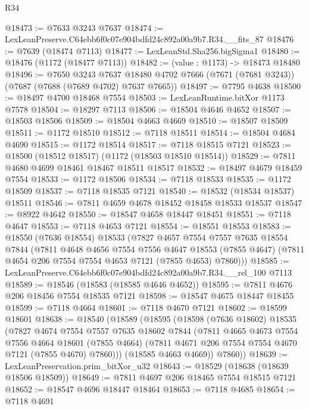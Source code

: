\begin{lexlean}{R34}
\begin{coremodule}
@18473 := @7633 @3243 @7637
@18474 := LexLeanPreserve.C64ebb6f0c07e904bdfd24c892a00a9b7.R34.__fits_87
@18476 := @7639 (@18474 @7113)
@18477 := LexLeanStd.Sha256.bigSigma1
@18480 := @18476 (@1172 (@18477 @7113))
@18482 := (value : @1173) -> @18473 @18480
@18496 := @7650
    @3243
    @7637
    @18480
    @4702
    @7666
    (@7671 (@7681 @3243))
    (@7687 (@7688 (@7689 @4702) @7637 @7665))
@18497 := @7795 @4638
@18500 := @18497 @4700 @18468 @7554
@18503 := LexLeanRuntime.bitXor @1173 @7578
@18504 := @18297 @7113
@18506 := @18504 @4646 @4652
@18507 := @18503 @18506
@18509 := @18504 @4663 @4669
@18510 := @18507 @18509
@18511 := @1172 @18510
@18512 := @7118 @18511
@18514 := @18504 @4684 @4690
@18515 := @1172 @18514
@18517 := @7118 @18515 @7121
@18523 := @18500 (@18512 @18517) (@1172 (@18503 @18510 @18514))
@18529 := @7811 @4680 @4699 @18461 @18467 @18511 @18517
@18532 := @18497 @4679 @18459 @7554
@18533 := @1172 @18506
@18534 := @7118 @18533
@18535 := @1172 @18509
@18537 := @7118 @18535 @7121
@18540 := @18532 (@18534 @18537) @18511
@18546 := @7811 @4659 @4678 @18452 @18458 @18533 @18537
@18547 := @8922 @4642
@18550 := @18547 @4658 @18447 @18451
@18551 := @7118 @4647
@18553 := @7118 @4653 @7121
@18554 := @18551 @18553
@18583 := @18550
    (@7636 @18554)
    @18533
    (@7827
      @4657
      @7554
      @7557
      @7635
      @18554
      @7844
      (@7811
        @4648
        @4656
        @7554
        @7556
        @4647
        @18553
        (@7855 @4647)
        (@7811 @4654 @206 @7554 @7554 @4653 @7121 (@7855 @4653) @7860)))
@18585 := LexLeanPreserve.C64ebb6f0c07e904bdfd24c892a00a9b7.R34.__rel_100 @7113
@18589 := @18546 (@18583 (@18585 @4646 @4652))
@18595 := @7811 @4676 @206 @18456 @7554 @18535 @7121
@18598 := @18547 @4675 @18447 @18455
@18599 := @7118 @4664
@18601 := @7118 @4670 @7121
@18602 := @18599 @18601
@18638 := @18540
    (@18589
      (@18595
        (@18598
          (@7636 @18602)
          @18535
          (@7827
            @4674
            @7554
            @7557
            @7635
            @18602
            @7844
            (@7811
              @4665
              @4673
              @7554
              @7556
              @4664
              @18601
              (@7855 @4664)
              (@7811 @4671 @206 @7554 @7554 @4670 @7121 (@7855 @4670) @7860)))
          (@18585 @4663 @4669))
        @7860))
@18639 := LexLeanPreservation.prim_bitXor_u32
@18643 := @18529 (@18638 (@18639 @18506 @18509))
@18649 := @7811 @4697 @206 @18465 @7554 @18515 @7121
@18652 := @18547 @4696 @18447 @18464
@18653 := @7118 @4685
@18654 := @7118 @4691

\end{coremodule}
\end{lexlean}
